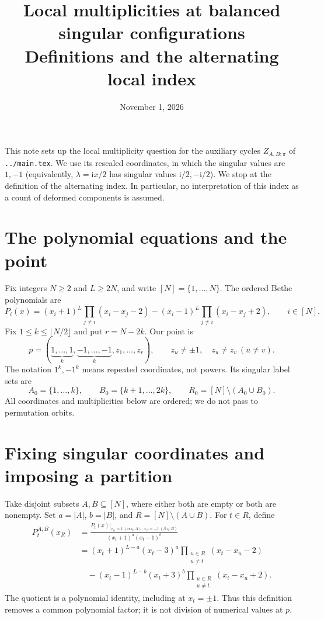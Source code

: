 \documentclass[11pt]{article}
\title{Local multiplicities at balanced singular configurations\\
\large Definitions and the alternating local index}
\author{}
\date{November 1, 2026}
\newcommand{\ii}{\mathrm i}
\begin{document}
\maketitle
\vspace{-2em}

This note sets up the local multiplicity question for the auxiliary
cycles $Z_{A,B;\pi}$ of \texttt{../main.tex}.
We use its rescaled coordinates, in which the singular values are
$1,-1$ (equivalently, $\lambda=\ii x/2$ has singular values
$\ii/2,-\ii/2$). We stop at the definition of the alternating index.
In particular, no interpretation of this index as a count of deformed
components is assumed.

\section{The polynomial equations and the point}

Fix integers $N\geq 2$ and $L\geq 2N$, and write $[N]=\{1,\ldots,N\}$.
The ordered Bethe polynomials are
\begin{equation}\label{eq:bethe}
 P_i(x)=(x_i+1)^L\prod_{j\ne i}(x_i-x_j-2)
       -(x_i-1)^L\prod_{j\ne i}(x_i-x_j+2),
 \qquad i\in[N].
\end{equation}
Fix $1\leq k\leq\lfloor N/2\rfloor$ and put $r=N-2k$. Our point is
\[
 p=(\underbrace{1,\ldots,1}_{k},
    \underbrace{-1,\ldots,-1}_{k},z_1,\ldots,z_r),
 \qquad z_u\ne\pm1,\quad z_u\ne z_v\ (u\ne v).
\]
The notation $1^k,-1^k$ means repeated coordinates, not powers.
Its singular label sets are
\[
 A_0=\{1,\ldots,k\},\qquad B_0=\{k+1,\ldots,2k\},
 \qquad R_0=[N]\setminus(A_0\cup B_0).
\]
All coordinates and multiplicities below are ordered; we do not pass
to permutation orbits.

\section{Fixing singular coordinates and imposing a partition}

Take disjoint subsets $A,B\subseteq[N]$, where either both are empty
or both are nonempty. Set $a=|A|$, $b=|B|$, and
$R=[N]\setminus(A\cup B)$. For $t\in R$, define
\begin{equation}\label{eq:reduced}
\begin{aligned}
 P_t^{A,B}(x_R)
 &=
 \frac{P_t(x)|_{x_\alpha=1\ (\alpha\in A),\,x_\beta=-1\ (\beta\in B)}}
      {(x_t+1)^a(x_t-1)^b}\\
 &=(x_t+1)^{L-a}(x_t-3)^a
       \prod_{\substack{u\in R\\u\ne t}}(x_t-x_u-2)\\
 &\quad -(x_t-1)^{L-b}(x_t+3)^b
       \prod_{\substack{u\in R\\u\ne t}}(x_t-x_u+2).
\end{aligned}
\end{equation}
The quotient is a polynomial identity, including at $x_t=\pm1$.
Thus this definition removes a common polynomial factor;
it is not division of numerical values at $p$.
\end{document}
